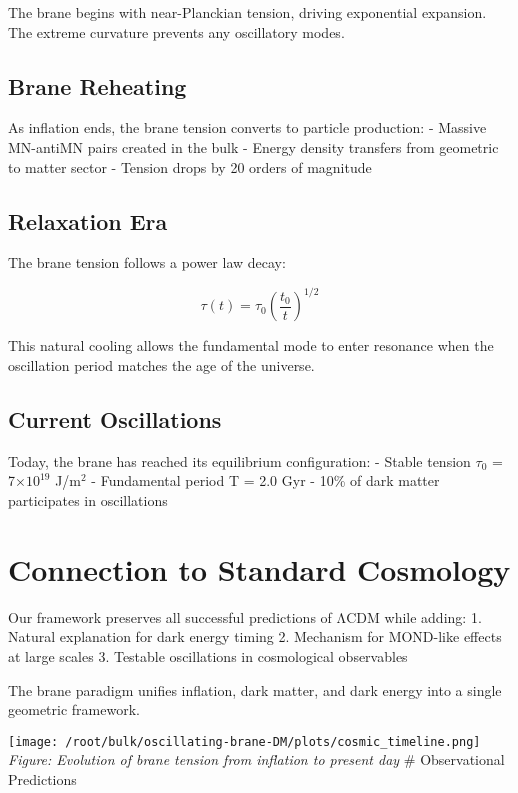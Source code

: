 \documentclass[
  11pt,
]{report}
\begin{document}
The brane begins with near-Planckian tension, driving exponential
expansion. The extreme curvature prevents any oscillatory modes.

\subsection{Brane Reheating}\label{brane-reheating}

As inflation ends, the brane tension converts to particle production: -
Massive MN-antiMN pairs created in the bulk - Energy density transfers
from geometric to matter sector - Tension drops by 20 orders of
magnitude

\subsection{Relaxation Era}\label{relaxation-era}

The brane tension follows a power law decay:

\[\tau(t) = \tau_0 \left(\frac{t_0}{t}\right)^{1/2}\]

This natural cooling allows the fundamental mode to enter resonance when
the oscillation period matches the age of the universe.

\subsection{Current Oscillations}\label{current-oscillations}

Today, the brane has reached its equilibrium configuration: - Stable
tension \(\tau_0\) = 7\(\times 10^{19}\) J/m\(^2\) - Fundamental period
T = 2.0 Gyr - 10\% of dark matter participates in oscillations

\section{Connection to Standard
Cosmology}\label{connection-to-standard-cosmology}

Our framework preserves all successful predictions of ΛCDM while adding:
1. Natural explanation for dark energy timing 2. Mechanism for MOND-like
effects at large scales 3. Testable oscillations in cosmological
observables

The brane paradigm unifies inflation, dark matter, and dark energy into
a single geometric framework.

\texttt{[image: /root/bulk/oscillating-brane-DM/plots/cosmic\_timeline.png]}
\emph{Figure: Evolution of brane tension from inflation to present day}
\newpage \# Observational Predictions
\end{document}
